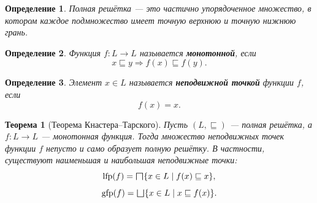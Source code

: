 \documentclass[12pt,a4paper]{article}
\newcommand{\BigSqcap}{\mathop{\mathchoice
  {\vcenter{\hbox{\Large$\sqcap$}}}
  {\vcenter{\hbox{\large$\sqcap$}}}
  {\vcenter{\hbox{\normalsize$\sqcap$}}}
  {\vcenter{\hbox{\small$\sqcap$}}}}\displaylimits}
\newcommand{\BigSqcup}{\mathop{\mathchoice
  {\vcenter{\hbox{\Large$\sqcup$}}}
  {\vcenter{\hbox{\large$\sqcup$}}}
  {\vcenter{\hbox{\normalsize$\sqcup$}}}
  {\vcenter{\hbox{\small$\sqcup$}}}}\displaylimits}
\newtheorem{definition}{Определение}
\newtheorem{theorem}{Теорема}
\begin{document}
\begin{definition}
Полная решётка --- это частично упорядоченное множество, в котором каждое подмножество имеет точную верхнюю и точную нижнюю грань.
\end{definition}

\begin{definition}
Функция $f : L \to L$ называется \textbf{монотонной}, если
\[
x \sqsubseteq y \Rightarrow f(x) \sqsubseteq f(y).
\]
\end{definition}

\begin{definition}
Элемент $x \in L$ называется \textbf{неподвижной точкой} функции $f$, если
\[
f(x)=x.
\]
\end{definition}

\begin{theorem}[Теорема Кнастера--Тарского]
Пусть $(L,\sqsubseteq)$ --- полная решётка, а $f : L \to L$ --- монотонная функция. Тогда множество неподвижных точек функции $f$ непусто и само образует полную решётку. В частности, существуют наименьшая и наибольшая неподвижные точки:
\[
\operatorname{lfp}(f)=\BigSqcap \{x \in L \mid f(x) \sqsubseteq x\},
\]
\[
\operatorname{gfp}(f)=\BigSqcup \{x \in L \mid x \sqsubseteq f(x)\}.
\]
\end{theorem}
\end{document}
